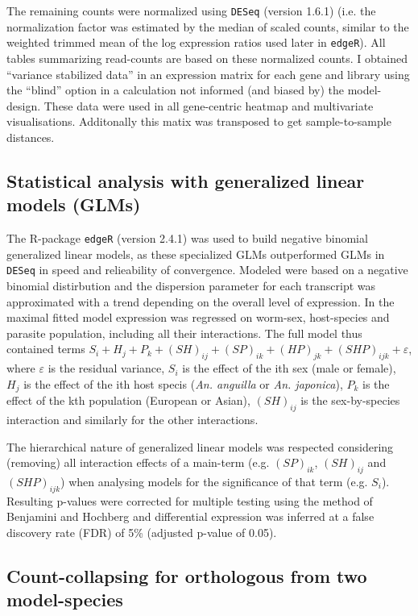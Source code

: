 The remaining counts were normalized using \texttt{DESeq} (version
1.6.1) (i.e.  the normalization factor was estimated by the median of
scaled counts, similar to the weighted trimmed mean of the log
expression ratios used later in \texttt{edgeR}). All tables
summarizing read-counts are based on these normalized counts. I
obtained ``variance stabilized data'' in an expression matrix for each
gene and library using the ``blind'' option in a calculation not
informed (and biased by) the model-design. These data were used in all
gene-centric heatmap and multivariate visualisations. Additonally this
matix was transposed to get sample-to-sample distances.

\subsection{Statistical analysis with generalized linear models (GLMs)}

The R-package \texttt{edgeR} (version 2.4.1) \cite{pmid19910308} was
used to build negative binomial generalized linear models, as these
specialized GLMs outperformed GLMs in \texttt{DESeq} in speed and
relieability of convergence. Modeled were based on a negative binomial
distirbution and the dispersion parameter for each transcript was
approximated with a trend depending on the overall level of
expression. In the maximal fitted model expression was regressed on
worm-sex, host-species and parasite population, including all their
interactions. The full model thus contained terms $ S_i + H_j + P_k +
(SH)_{ij} + (SP)_{ik} + (HP)_{jk} + (SHP)_{ijk} + \varepsilon$, where
$\varepsilon$ is the residual variance, $S_i$ is the effect of the ith
sex (male or female), $H_j$ is the effect of the ith host specis
(\textit{An. anguilla} or \textit{An. japonica}), $P_k$ is the effect
of the kth population (European or Asian), $(SH)_{ij}$ is the
sex-by-species interaction and similarly for the other interactions.

The hierarchical nature of generalized linear models was respected
considering (removing) all interaction effects of a main-term
(e.g. $(SP)_{ik}$, $(SH)_{ij}$ and $(SHP)_{ijk}$) when analysing
models for the significance of that term (e.g. $S_i$). Resulting
p-values were corrected for multiple testing using the method of
Benjamini and Hochberg \cite{benjamini1995controlling} and
differential expression was inferred at a false discovery rate (FDR)
of 5\% (adjusted p-value of 0.05).

\subsection{Count-collapsing for orthologous from two model-species}
\label{collapse}

